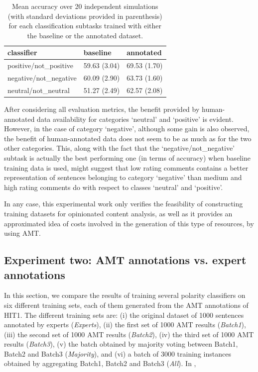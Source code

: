 \documentclass[11pt,letterpaper]{article}
\begin{document}
\begin{table}
\begin{tabular}{|l|l|l|}
\hline
classifier &baseline &annotated \\ 
\hline
positive/not\_positive &59.63 (3.04) &69.53 (1.70) \\ 
\hline
negative/not\_negative &60.09 (2.90) &63.73 (1.60) \\ 
\hline
neutral/not\_neutral &51.27 (2.49) &62.57 (2.08) \\ 
\hline
\end{tabular}
\caption{Mean accuracy over 20 independent simulations (with standard deviations provided in parenthesis) 
for each classification subtasks trained with either the baseline or the annotated dataset.}
\label{tc_accu}
\end{table}

After considering all evaluation metrics, the benefit provided by human-annotated data 
availability for categories `neutral' and `positive' is evident. However, in the case of category `negative', although some 
gain is also observed, the benefit of human-annotated data does not seem to be as much as for the two other 
categories. This, along with the fact that the `negative/not\_negative' subtask is actually the best performing
one (in terms of accuracy) when baseline training data is used, might suggest that low rating comments contains 
a better representation of sentences belonging to category `negative' than medium and high rating comments do with
respect to classes `neutral' and `positive'. 

In any case, this experimental work only verifies the feasibility of constructing training datasets for
opinionated content analysis, as well as it provides an approximated idea of costs involved in the generation
of this type of resources, by using AMT.


\subsection{Experiment two: AMT annotations vs. expert annotations}
\label{eval2}

In this section, we compare the results of training several polarity classifiers on six different training sets, each of them generated from the AMT annotations of HIT1. The different training sets are: (i) the original dataset of 1000 sentences annotated by experts (\textit{Experts}), (ii) the first set of 1000 AMT results (\textit{Batch1}), (iii) the second set of 1000 AMT results (\textit{Batch2}), (iv) the third set of 1000 AMT results (\textit{Batch3}), (v) the batch obtained by majority voting between Batch1, Batch2 and Batch3 (\textit{Majority}), and (vi) a batch of 3000 training instances obtained by aggregating Batch1, Batch2 and Batch3 (\textit{All}). In \cite{mccallum}, 
\end{document}
